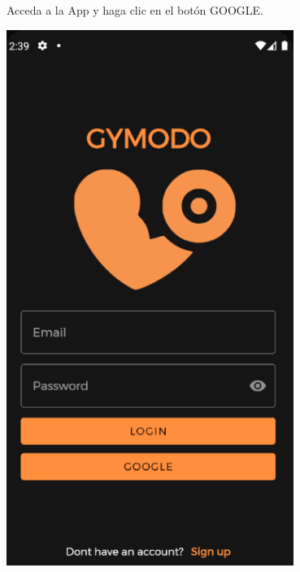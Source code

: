 \documentclass[12pt,a4paper]{article}
\begin{document}
\begin{enumerate}
\begin{minipage}{.60\textwidth}
  \item Acceda a la App y haga clic en el botón GOOGLE.
\end{minipage}
\begin{minipage}{.40\textwidth}
  \includegraphics[width=0.7\textwidth, right]{loginpage}
\end{minipage}


\end{enumerate}
\end{document}
